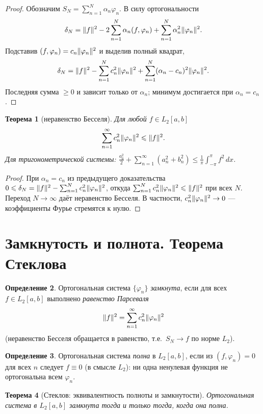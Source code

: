 \documentclass[11pt,a4paper]{article}
\theoremstyle{definition}
\newtheorem{definition}{Определение}[section]
\theoremstyle{plain}
\newtheorem{theorem}[definition]{Теорема}
\newcommand{\dx}{\,dx}
\renewcommand{\le}{\leqslant}
\renewcommand{\ge}{\geqslant}
\DeclarePairedDelimiter{\norm}{\lVert}{\rVert}
\begin{document}
\begin{proof}
Обозначим $S_N=\sum_{n=1}^N\alpha_n\varphi_n$. В силу ортогональности
\[
  \delta_N=\norm{f}^2-2\sum_{n=1}^N\alpha_n(f,\varphi_n)+\sum_{n=1}^N\alpha_n^2\norm{\varphi_n}^2 .
\]
Подставив $(f,\varphi_n)=c_n\norm{\varphi_n}^2$ и выделив полный квадрат,
\[
  \delta_N=\norm{f}^2-\sum_{n=1}^N c_n^2\norm{\varphi_n}^2
   +\sum_{n=1}^N(\alpha_n-c_n)^2\norm{\varphi_n}^2 .
\]
Последняя сумма $\ge0$ и зависит только от $\alpha_n$; минимум достигается при $\alpha_n=c_n$.
\end{proof}

\begin{theorem}[неравенство Бесселя]
Для любой $f\in L_2[a,b]$
\[
  \sum_{n=1}^\infty c_n^2\norm{\varphi_n}^2\le\norm{f}^2 .
\]
Для тригонометрической системы:
$\displaystyle\frac{a_0^2}{2}+\sum_{n=1}^\infty(a_n^2+b_n^2)\le\frac1\pi\int_{-\pi}^{\pi}f^2\dx$.
\end{theorem}

\begin{proof}
При $\alpha_n=c_n$ из предыдущего доказательства
$0\le\delta_N=\norm{f}^2-\sum_{n=1}^N c_n^2\norm{\varphi_n}^2$, откуда
$\sum_{n=1}^N c_n^2\norm{\varphi_n}^2\le\norm{f}^2$ при всех $N$. Переход $N\to\infty$ даёт
неравенство Бесселя. В частности, $c_n^2\norm{\varphi_n}^2\to0$ — коэффициенты Фурье стремятся к
нулю.
\end{proof}

\section{Замкнутость и полнота. Теорема Стеклова}

\begin{definition}
Ортогональная система $\{\varphi_n\}$ \emph{замкнута}, если для всех $f\in L_2[a,b]$ выполнено
\emph{равенство Парсеваля}
\[
  \norm{f}^2=\sum_{n=1}^\infty c_n^2\norm{\varphi_n}^2
\]
(неравенство Бесселя обращается в равенство, т.е.\ $S_N\to f$ по норме $L_2$).
\end{definition}

\begin{definition}
Ортогональная система \emph{полна} в $L_2[a,b]$, если из $(f,\varphi_n)=0$ для всех $n$ следует
$f\equiv0$ (в смысле $L_2$): ни одна ненулевая функция не ортогональна всем $\varphi_n$.
\end{definition}

\begin{theorem}[Стеклов: эквивалентность полноты и замкнутости]
Ортогональная система в $L_2[a,b]$ замкнута тогда и только тогда, когда она полна.
\end{theorem}
\end{document}
